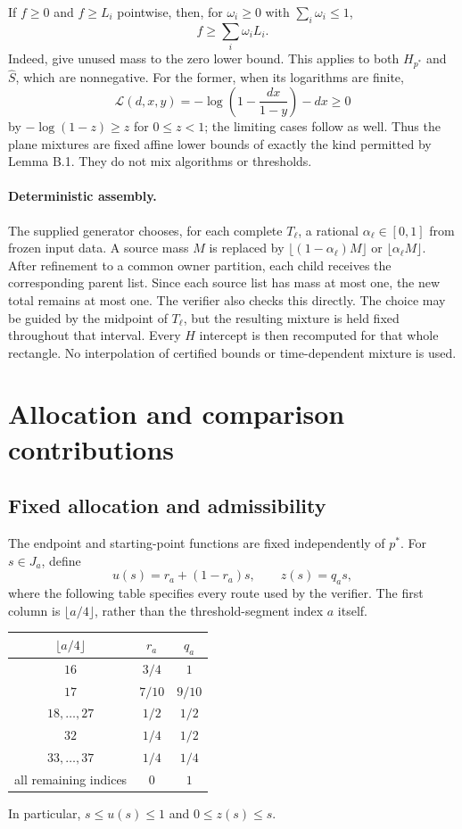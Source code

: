 \documentclass[11pt,a4paper]{article}
\begin{document}
If $f\ge0$ and $f\ge L_i$ pointwise, then, for $\omega_i\ge0$ with
$\sum_i\omega_i\le1$,
\[
 f\ge\sum_i\omega_i L_i.
\]
Indeed, give unused mass to the zero lower bound. This applies to both
$H_{p^*}$ and $\widehat S$, which are nonnegative. For the former, when its
logarithms are finite,
\[
 \mathcal L(d,x,y)
 =-\log\!\left(1-\frac{dx}{1-y}\right)-dx\ge0
\]
by $-\log(1-z)\ge z$ for $0\le z<1$; the limiting cases follow as well.
Thus the plane mixtures are fixed affine lower bounds of exactly the kind
permitted by Lemma B.1. They do not mix algorithms or thresholds.

\paragraph{Deterministic assembly.}
The supplied generator chooses, for each complete $T_\ell$, a rational
$\alpha_\ell\in[0,1]$ from frozen input data. A source mass $M$ is replaced
by $\lfloor(1-\alpha_\ell)M\rfloor$ or $\lfloor\alpha_\ell M\rfloor$.
After refinement to a common owner partition, each child receives the
corresponding parent list. Since each source list has mass at most one,
the new total remains at most one. The verifier also checks this directly.
The choice may be guided by the midpoint of $T_\ell$, but the resulting
mixture is held fixed throughout that interval. Every $H$ intercept is then
recomputed for that whole rectangle. No interpolation of certified bounds
or time-dependent mixture is used.


\section{Allocation and comparison contributions}\label{sec:allocation}
\subsection{Fixed allocation and admissibility}
The endpoint and starting-point functions are fixed independently of
$p^*$.  For $s\in J_a$, define
\[
 u(s)=r_a+(1-r_a)s,\qquad z(s)=q_a s,
\]
where the following table specifies every route used by the verifier.
The first column is $\lfloor a/4\rfloor$, rather than the threshold-segment
index $a$ itself.
\begin{center}
\begin{tabular}{c|c|c}
$\lfloor a/4\rfloor$ & $r_a$ & $q_a$\\ \hline
$16$ & $3/4$ & $1$\\
$17$ & $7/10$ & $9/10$\\
$18,\ldots,27$ & $1/2$ & $1/2$\\
$32$ & $1/4$ & $1/2$\\
$33,\ldots,37$ & $1/4$ & $1/4$\\
all remaining indices & $0$ & $1$
\end{tabular}
\end{center}
In particular, $s\leq u(s)\leq1$ and $0\leq z(s)\leq s$.
\end{document}
